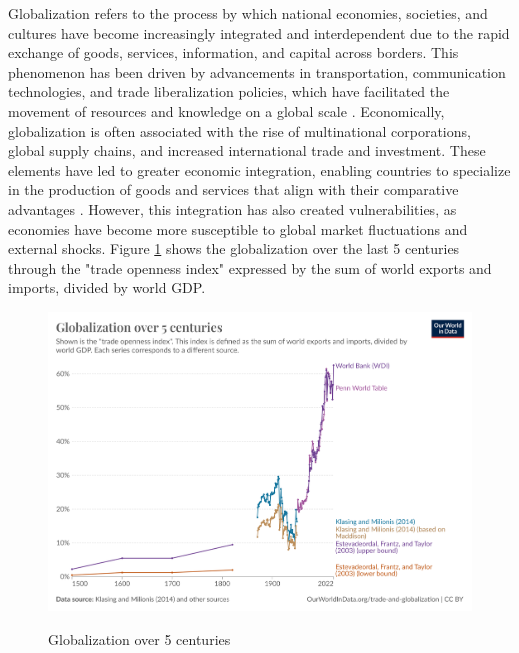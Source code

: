 Globalization refers to the process by which national economies, societies, and cultures have become increasingly integrated and interdependent due to the rapid exchange of goods, services, information, and capital across borders. This phenomenon has been driven by advancements in transportation, communication technologies, and trade liberalization policies, which have facilitated the movement of resources and knowledge on a global scale \citep{Held1999globalTransformations}. Economically, globalization is often associated with the rise of multinational corporations, global supply chains, and increased international trade and investment. These elements have led to greater economic integration, enabling countries to specialize in the production of goods and services that align with their comparative advantages \citep{krugman2010internationalEconomics}. However, this integration has also created vulnerabilities, as economies have become more susceptible to global market fluctuations and external shocks. Figure \ref{fig:globalizationOver5Centuries} shows the globalization over the last 5 centuries through the "trade openness index" expressed by the sum of world exports and imports, divided by world GDP.
\begin{figure}[H]
    \centering
    \includegraphics[scale=0.1]{globalization-over-5-centuries.png}
    \caption{Globalization over 5 centuries}
    \label{fig:globalizationOver5Centuries}
    \citep{ourWorldInData2023globalization5centuries}
\end{figure}

